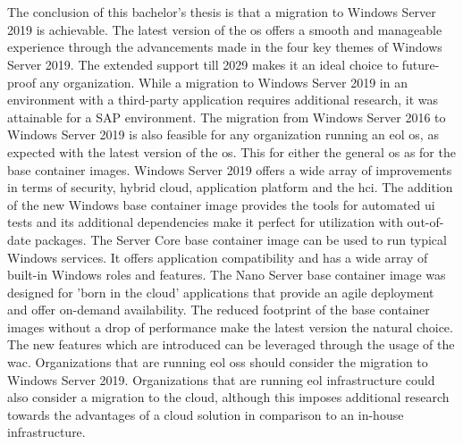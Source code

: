 \chapter{}
\label{ch:conclusie}
The conclusion of this bachelor's thesis is that a migration to Windows Server 2019 is achievable.
The latest version of the \acrshort{os} offers a smooth and manageable experience through the advancements made in the four key themes of Windows Server 2019. 
The extended support till 2029 makes it an ideal choice to future-proof any organization. 
While a migration to Windows Server 2019 in an environment with a third-party application requires additional research, it was attainable for a SAP environment. 
The migration from Windows Server 2016 to Windows Server 2019 is also feasible for any organization running an \acrshort{eol} \acrshort{os}, as expected with the latest version of the \acrshort{os}.
This for either the general \acrshort{os} as for the base container images.
Windows Server 2019 offers a wide array of improvements in terms of security, hybrid cloud, application platform and the \acrlong{hci}.
The addition of the new Windows base container image provides the tools for automated \acrshort{ui} tests and its additional dependencies make it perfect for utilization with out-of-date packages. 
The Server Core base container image can be used to run typical Windows services. 
It offers application compatibility and has a wide array of built-in Windows roles and features. 
The Nano Server base container image was designed for 'born in the cloud' applications that provide an agile deployment and offer on-demand availability. 
The reduced footprint of the base container images without a drop of performance make the latest version the natural choice. 
The new features which are introduced can be leveraged through the usage of the \acrfull{wac}.
Organizations that are running \acrshort{eol} \acrlong{os}s should consider the migration to Windows Server 2019.
Organizations that are running \acrshort{eol} infrastructure could also consider a migration to the cloud, although this imposes additional research towards the advantages of a cloud solution in comparison to an in-house infrastructure.
